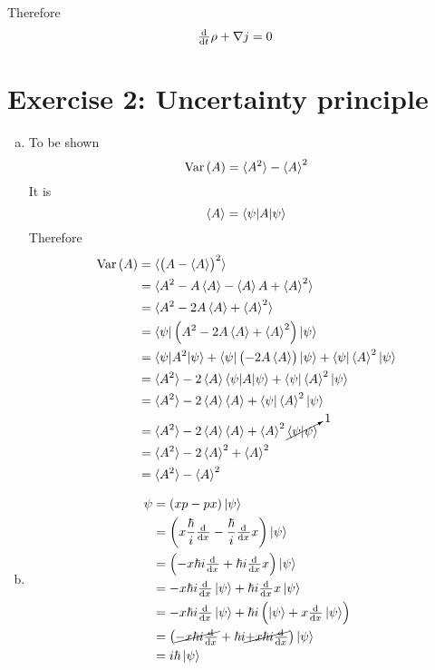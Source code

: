 \documentclass[a4paper,german,12pt,smallheadings]{scrartcl}
\DeclareMathOperator{\Var}{Var}
\begin{document}
Therefore
\begin{equation*}
  \od{}{t} \rho + \nabla j = 0
\end{equation*}

\section*{Exercise 2: Uncertainty principle}
\begin{enumerate}[a)]
  \item
    To be shown
    \begin{equation*}
      \Var\del{A} = \braket{A^2} - \braket{A}^2
    \end{equation*}
    It is
    \begin{equation*}
      \braket{A} = \braket{\psi|A|\psi}
    \end{equation*}
    Therefore
    \begin{align*}
      \Var\del{A} &= \braket{\del{A - \braket{A}}^2} \\
                  &= \braket{A^2 - A\braket{A} - \braket{A}A + \braket{A}^2} \\
                  &= \braket{A^2 - 2A\braket{A} + \braket{A}^2} \\
                  &= \braket{\psi|\del{A^2 - 2A\braket{A} + \braket{A}^2}|\psi} \\
                  &= \braket{\psi|A^2|\psi} + \braket{\psi|\del{-2A\braket{A}}|\psi}+ \braket{\psi|\braket{A}^2|\psi} \\
                  &= \braket{A^2} - 2\braket{A}\braket{\psi|A|\psi} + \braket{\psi|\braket{A}^2|\psi} \\
                  &= \braket{A^2} - 2\braket{A}\braket{A} + \braket{\psi|\braket{A}^2|\psi} \\
                  &= \braket{A^2} - 2\braket{A}\braket{A} + \braket{A}^2 \cancelto{1}{\braket{\psi|\psi}} \\
                  &= \braket{A^2} - 2\braket{A}^2 + \braket{A}^2 \\
                  &= \braket{A^2} - \braket{A}^2
    \end{align*}
  \item
    \begin{align*}
      \sbr[x,p]\ket{\psi} &= \del{xp - px}\ket{\psi} \\
                          &= \del{x \frac{\hbar}{i} \od{}{x} - \frac{\hbar}{i} \od{}{x} x} \ket{\psi} \\
                          &= \del{-x \hbar i \od{}{x} + \hbar i \od{}{x} x} \ket{\psi} \\
                          &= -x \hbar i \od{}{x} \ket{\psi} + \hbar i \od{}{x} x \ket{\psi} \\
                          &= -x \hbar i \od{}{x} \ket{\psi} + \hbar i \del{\ket{\psi} + x \od{}{x}\ket{\psi}} \\
                          &= \del{\cancel{-x \hbar i \od{}{x}} + \hbar i \cancel{+ x \hbar i \od{}{x}}} \ket{\psi} \\
                          &= i \hbar \ket{\psi}
    \end{align*}
\end{enumerate}
\end{document}
